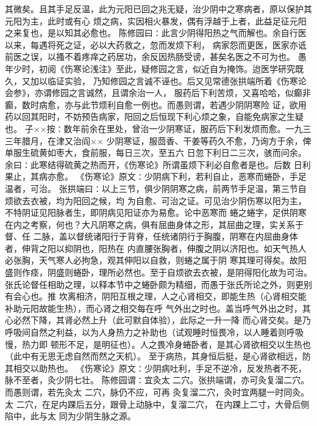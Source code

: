 \documentclass[a4paper,12pt,UTF8,twoside]{ctexbook}
\begin{document}
其微矣。且其手足反温，此为元阳已回之兆无疑，治少阴中之寒病者，原以保护其元阳为主，此时或有心 
烦之病，实因相火暴发，偶有浮越于上者，此益足征元阳之来复也，是以知其必愈也。 
陈修园曰∶此言少阴得阳热之气而解也。余自行医以来，每遇将死之证，必以大药救之，忽而发烦下利， 
病家怨而更医，医家亦诋前医之误，以搔不着疼痒之药居功，余反因热肠受谤，甚矣名医之不可为也。 
愚年少时，初阅《伤寒论浅注》至此，疑修园之言，似近自为掩饰。迨医学研究既久，又加以临证实验， 
乃知修园之言诚不诬也。后又见常德张拱端所着《伤寒论会参》，亦谓修园之言诚然，且谓余治一人， 
服药后下利苦烦，又喜哈哈，似癫非癫，数时病愈，亦与此节烦利自愈一例也。而愚则谓，若遇少阴阴寒险 
证，欲用药以回其阳时，不妨预告病家，阳回之后恒现下利心烦之象，自能免病家之生疑也。 
子××按∶数年前余在里处，曾治一少阴寒证，服药后下利发烦而愈。一九三三年腊月，在津又治阎×× 
少阴寒证，服茴香、干姜等药久不愈，乃询方于余，俾单服生硫黄如枣大，食前服，每日三次，至五六 
日忽下利日二三次，骇而问余。余曰∶此寒结得硫黄之热而开，《伤寒论》所谓虽烦下利必自愈者是也。后数 
日利果止，其病亦愈。 
《伤寒论》原文∶少阴病下利，若利自止，恶寒而蜷卧，手足温者，可治。 
张拱端曰∶以上三节，俱少阴阴寒之病，前两节手足温，第三节自烦欲去衣被，均为阳回之候，均 
为自愈、可治之证。可见治少阴伤寒以阳为主，不特阴证见阳脉者生，即阴病见阳证亦为易愈。论中恶寒而 
蜷之蜷字，足供阴寒在内之考察，何也？大凡阴寒之病，俱有屈曲身体之形，其屈曲之理，实关系于督、任 
二脉，盖以督统诸阳行于背脊，任统诸阴行于胸腹，阴寒在内屈曲身体者，伸背之阳以抑阴也，阳热在 
内直腰张胸者，伸腹之阴以济阳也。如天气热人必张胸，天气寒人必拘急，观其伸阳以自救，则蜷之属于阴 
寒其理可得矣。故阳盛则作痉，阴盛则蜷卧，理所必然也。至于自烦欲去衣被，是阴得阳化故为可治。 
张氏论督任相助之理，以释本节中之蜷卧颇为精细，而愚于张氏所论之外，则更别有会心也。推 
坎离相济，阴阳互根之理，人之心肾相交，即能生热（心肾相交能补助元阳故能生热），而心肾之相交每在呼 
气外出之时也。盖当呼气外出之时，其心必然下降，其肾必然上升（此可默自体验），此际之一升一降 
而心肾交矣。是乃呼吸间自然之利益，以为人身热力之补助也（试观睡时恒畏冷，以人睡着则呼吸慢，热力即 
顿形不足，是明征也）。人之畏冷身蜷卧者，是其心肾欲相交以生热也（此中有无思无虑自然而然之天机）。 
至于病热，其身恒后挺，是心肾欲相远，防其相交以助热也。 
《伤寒论》原文∶少阴病吐利，手足不逆冷，反发热者不死，脉不至者，灸少阴七壮。 
陈修园谓∶宜灸太 二穴。张拱端谓，亦可灸复溜二穴。而愚则谓，若先灸太 二穴，脉仍不应，可再 
灸复溜二穴，灸时宜两腿一时同灸。太 二穴，在足内踝后五分，跟骨上动脉中，复溜二穴， 
在内踝上二寸，大骨后侧陷中，此与太 同为少阴生脉之源。 
\end{document}
